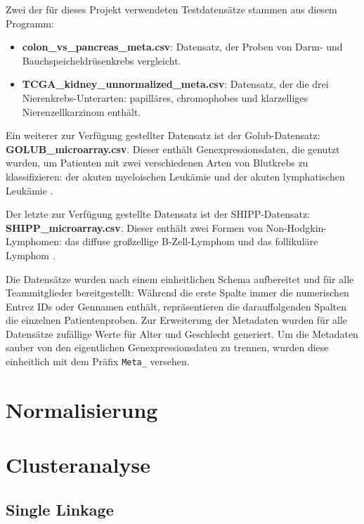 \documentclass[12pt]{article}
\begin{document}
\noindent Zwei der für dieses Projekt verwendeten Testdatensätze stammen aus diesem Programm: 
\begin{itemize}
    \item \textbf{colon\_vs\_pancreas\_meta.csv}: Datensatz, der Proben von Darm- und Bauchspeicheldrüsenkrebs vergleicht.
    \item \textbf{TCGA\_kidney\_unnormalized\_meta.csv}: Datensatz, der die drei Nierenkrebs-Unterarten: papilläres, chromophobes und klarzelliges Nierenzellkarzinom enthält.
\end{itemize}
\noindent Ein weiterer zur Verfügung gestellter Datensatz ist der Golub-Datensatz: \textbf{GOLUB\_microarray.csv}. Dieser enthält Genexpressionsdaten, die genutzt wurden, um Patienten mit zwei verschiedenen Arten von Blutkrebs zu klassifizieren: der akuten myeloischen Leukämie und der akuten lymphatischen Leukämie \cite{golub1999}. 

\noindent Der letzte zur Verfügung gestellte Datensatz ist der SHIPP-Datensatz: \textbf{SHIPP\_microarray.csv}. Dieser enthält zwei Formen von Non-Hodgkin-Lymphomen: das diffuse großzellige B-Zell-Lymphom und das follikuläre Lymphom \cite{shipp2002}.

\noindent Die Datensätze wurden nach einem einheitlichen Schema aufbereitet und für alle Teammitglieder bereitgestellt: Während die erste Spalte immer die numerischen Entrez IDs oder Gennamen enthält, repräsentieren die darauffolgenden Spalten die einzelnen Patientenproben. Zur Erweiterung der Metadaten wurden für alle Datensätze zufällige Werte für Alter und Geschlecht generiert. Um die Metadaten sauber von den eigentlichen Genexpressionsdaten zu trennen, wurden diese einheitlich mit dem Präfix \texttt{Meta\_} versehen.


\newpage
\pagestyle{fancy}
\fancyhead{}
\section{Normalisierung}
\label{normalisierung}


\section{Clusteranalyse}
\label{clusteranalyse}

\subsection{Single Linkage}
\label{single-linkage}
\end{document}
